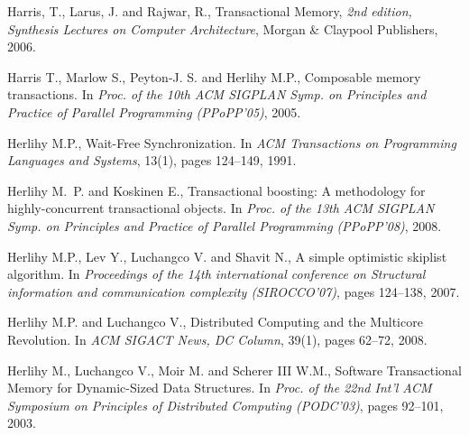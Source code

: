 \begin{thebibliography}{99}
{
 Harris, T.,  Larus, J. and  Rajwar, R.,
Transactional Memory, 
{\it 2nd edition, Synthesis Lectures on Computer Architecture},
Morgan \& Claypool Publishers, 2006.



Harris T., Marlow S., Peyton-J. S. and Herlihy M.P.,
\newblock Composable memory transactions.
\newblock In {\em Proc. of the 10th ACM SIGPLAN Symp. on Principles and
  Practice of Parallel Programming (PPoPP'05)}, 2005.




Herlihy M.P., 
Wait-Free Synchronization. 
In {\it ACM Transactions on Programming Languages and Systems}, 
13(1), pages 124--149, 1991. 



Herlihy M.~P. and Koskinen E.,
\newblock Transactional boosting: A methodology for highly-concurrent
  transactional objects.
\newblock In {\em Proc. of the 13th ACM SIGPLAN Symp. on Principles and
  Practice of Parallel Programming (PPoPP'08)}, 2008.





Herlihy M.P., Lev Y., Luchangco V. and Shavit N.,
\newblock A simple optimistic skiplist algorithm.
\newblock In {\em Proceedings of the 14th international conference on
  Structural information and communication complexity (SIROCCO'07)}, pages
  124--138, 2007.



Herlihy M.P.  and Luchangco V.,
Distributed Computing and the Multicore Revolution.
In {\it ACM SIGACT News, DC Column}, 39(1), pages 62--72, 2008.





Herlihy M.,  Luchangco V.,  Moir M. and  Scherer III W.M., 
 Software Transactional Memory for Dynamic-Sized Data Structures. 
In {\it  Proc. of the 22nd  Int'l  ACM Symposium on Principles of  Distributed 
Computing (PODC'03)},  pages 92--101,  2003. 

}
\end{thebibliography}
